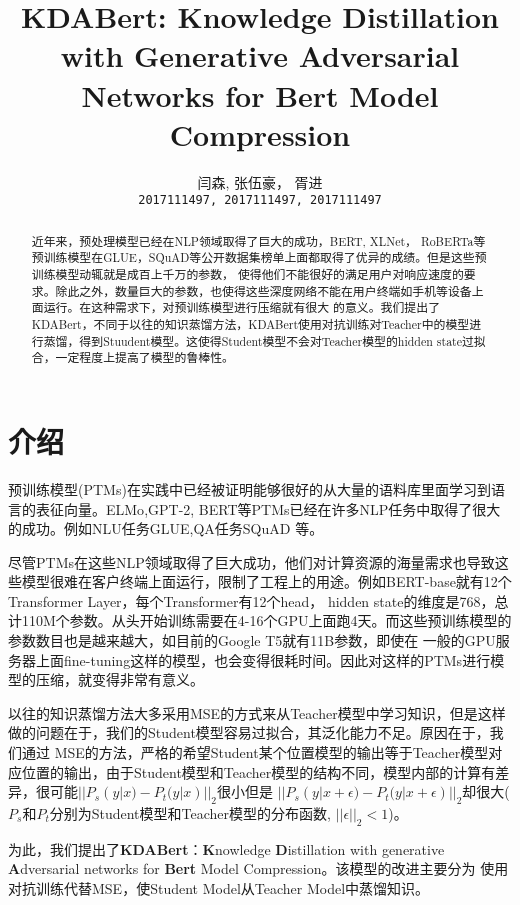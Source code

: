 \documentclass[11pt,a4paper]{article}
\title{KDABert: Knowledge Distillation with Generative Adversarial Networks for Bert Model Compression}
\author{
  闫森, \qquad 张伍豪， \qquad 胥进 \\
  \texttt{2017111497, 2017111497, 2017111497}
}
\date{}
\begin{document}

\maketitle
\begin{abstract}
    近年来，预处理模型已经在NLP领域取得了巨大的成功，BERT\cite[]{DBLP:journals/corr/abs-1810-04805}, XLNet\cite{DBLP:journals/corr/abs-1906-08237}，
    RoBERTa\cite{DBLP:journals/corr/abs-1907-11692}等预训练模型在GLUE，SQuAD等公开数据集榜单上面都取得了优异的成绩。但是这些预训练模型动辄就是成百上千万的参数，
    使得他们不能很好的满足用户对响应速度的要求。除此之外，数量巨大的参数，也使得这些深度网络不能在用户终端如手机等设备上面运行。在这种需求下，对预训练模型进行压缩就有很大
    的意义。我们提出了KDABert，不同于以往的知识蒸馏方法，KDABert使用对抗训练对Teacher中的模型进行蒸馏，得到Stuudent模型。这使得Student模型不会对Teacher模型的hidden 
    state过拟合，一定程度上提高了模型的鲁棒性。
\end{abstract}

\section{介绍}
预训练模型(PTMs)在实践中已经被证明能够很好的从大量的语料库里面学习到语言的表征向量。ELMo\cite{DBLP:journals/corr/abs-1802-05365},GPT-2\cite{radford2019language},
BERT\cite{DBLP:journals/corr/abs-1810-04805}等PTMs已经在许多NLP任务中取得了很大的成功。例如NLU任务GLUE\cite{wang-etal-2018-glue},QA任务SQuAD\cite{rajpurkar-etal-2016-squad}
等。

尽管PTMs在这些NLP领域取得了巨大成功，他们对计算资源的海量需求也导致这些模型很难在客户终端上面运行，限制了工程上的用途。例如BERT-base就有12个Transformer Layer，每个Transformer有12个head，
hidden state的维度是768，总计110M个参数。从头开始训练需要在4-16个GPU上面跑4天。而这些预训练模型的参数数目也是越来越大，如目前的Google T5\cite{raffel2019exploring}就有11B参数，即使在
一般的GPU服务器上面fine-tuning这样的模型，也会变得很耗时间。因此对这样的PTMs进行模型的压缩，就变得非常有意义。

以往的知识蒸馏方法大多采用MSE的方式来从Teacher模型中学习知识\cite{jiao2019tinybert,sun2019patient}，但是这样做的问题在于，我们的Student模型容易过拟合，其泛化能力不足。原因在于，我们通过
MSE的方法，严格的希望Student某个位置模型的输出等于Teacher模型对应位置的输出，由于Student模型和Teacher模型的结构不同，模型内部的计算有差异，很可能$||P_s(y|x) - P_t(y|x)||_2$很小但是
$||P_s(y|x+\epsilon) - P_t(y|x+\epsilon)||_2$却很大($P_s和P_t$分别为Student模型和Teacher模型的分布函数, $||\epsilon||_2 < 1$)。

为此，我们提出了\textbf{KDABert}：\textbf{K}nowledge \textbf{D}istillation with generative \textbf{A}dversarial networks for \textbf{Bert} Model Compression。该模型的改进主要分为
使用对抗训练代替MSE，使Student Model从Teacher Model中蒸馏知识。
\newpage

\end{document}
